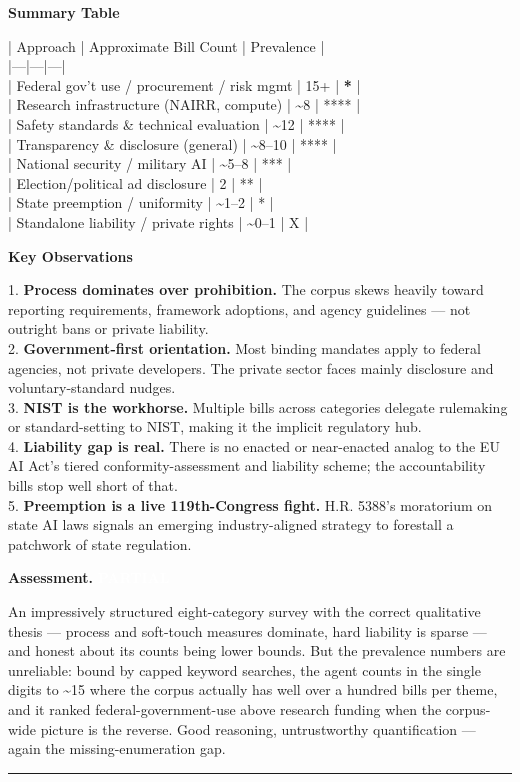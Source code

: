 \documentclass[11pt]{article}
\newcommand{\fieldlabel}[1]{\textbf{\color{navy}#1}\quad}
\begin{document}
\textbf{Summary Table}

| Approach | Approximate Bill Count | Prevalence | \\
|---|---|---| \\
| Federal gov't use / procurement / risk mgmt | 15+ | \textbf{*} | \\
| Research infrastructure (NAIRR, compute) | \textasciitilde{}8 | **** | \\
| Safety standards \& technical evaluation | \textasciitilde{}12 | **** | \\
| Transparency \& disclosure (general) | \textasciitilde{}8--10 | **** | \\
| National security / military AI | \textasciitilde{}5--8 | *** | \\
| Election/political ad disclosure | 2 | ** | \\
| State preemption / uniformity | \textasciitilde{}1--2 | * | \\
| Standalone liability / private rights | \textasciitilde{}0--1 | X |

\textbf{Key Observations}

1. \textbf{Process dominates over prohibition.} The corpus skews heavily toward reporting requirements, framework adoptions, and agency guidelines --- not outright bans or private liability. \\
2. \textbf{Government-first orientation.} Most binding mandates apply to federal agencies, not private developers. The private sector faces mainly disclosure and voluntary-standard nudges. \\
3. \textbf{NIST is the workhorse.} Multiple bills across categories delegate rulemaking or standard-setting to NIST, making it the implicit regulatory hub. \\
4. \textbf{Liability gap is real.} There is no enacted or near-enacted analog to the EU AI Act's tiered conformity-assessment and liability scheme; the accountability bills stop well short of that. \\
5. \textbf{Preemption is a live 119th-Congress fight.} H.R. 5388's moratorium on state AI laws signals an emerging industry-aligned strategy to forestall a patchwork of state regulation.

\fieldlabel{Assessment.} \colorbox{partialorange}{\textcolor{white}{\bfseries PARTIAL}}\par
An impressively structured eight-category survey with the correct qualitative thesis --- process and soft-touch measures dominate, hard liability is sparse --- and honest about its counts being lower bounds. But the prevalence numbers are unreliable: bound by capped keyword searches, the agent counts in the single digits to \textasciitilde{}15 where the corpus actually has well over a hundred bills per theme, and it ranked federal-government-use above research funding when the corpus-wide picture is the reverse. Good reasoning, untrustworthy quantification --- again the missing-enumeration gap.
\vspace{4pt}\hrule\vspace{8pt}
\end{document}
